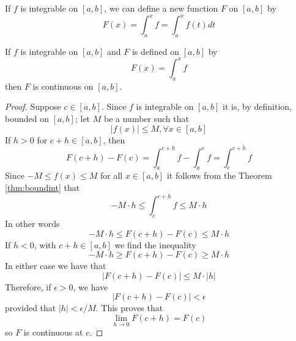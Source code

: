 If $f$ is integrable on $[a,b]$, we can define a new function $F$ on $[a,b]$ by \begin{equation}
    F(x) = \int_a^xf = \int_a^xf(t)dt
\end{equation}



\begin{theorem}
    If $f$ is integrable on $[a,b]$ and $F$ is defined on $[a,b]$ by \begin{equation*}
        F(x) = \int_a^xf
    \end{equation*}
    then $F$ is continuous on $[a,b]$.
\end{theorem}
\begin{proof}
    Suppose $c \in [a,b]$. Since $f$ is integrable on $[a,b]$ it is, by definition, bounded on $[a,b]$; let $M$ be a number such that \begin{equation*}
        |f(x)| \leq M,\forall x \in [a,b]
    \end{equation*}
    If $h > 0$ for $c+h \in [a,b]$, then \begin{equation*}
        F(c+h) - F(c) = \int_a^{c+h}f - \int_a^cf = \int_c^{c+h}f
    \end{equation*}
    Since $-M \leq f(x) \leq M$ for all $x \in [a,b]$ it follows from the Theorem \ref{thm:boundint} that \begin{equation*}
        -M\cdot h \leq \int_c^{c+h}f \leq M\cdot h
    \end{equation*}
    In other words \begin{equation*}
        -M\cdot h \leq F(c+h) - F(c) \leq M\cdot h
    \end{equation*}
    If $h < 0$, with $c+h \in [a,b]$ we find the inequality \begin{equation*}
        -M\cdot h \geq F(c+h) - F(c) \geq M\cdot h
    \end{equation*}
    In either case we have that \begin{equation*}
        |F(c+h) - F(c)| \leq M\cdot |h|
    \end{equation*}
    Therefore, if $\epsilon > 0$, we have \begin{equation*}
        |F(c+h) - F(c)| < \epsilon
    \end{equation*}
    provided that $|h| < \epsilon/M$. This proves that \begin{equation*}
        \lim\limits_{h\rightarrow 0}F(c+h) = F(c)
    \end{equation*}
    so $F$ is continuous at $c$.
\end{proof}

